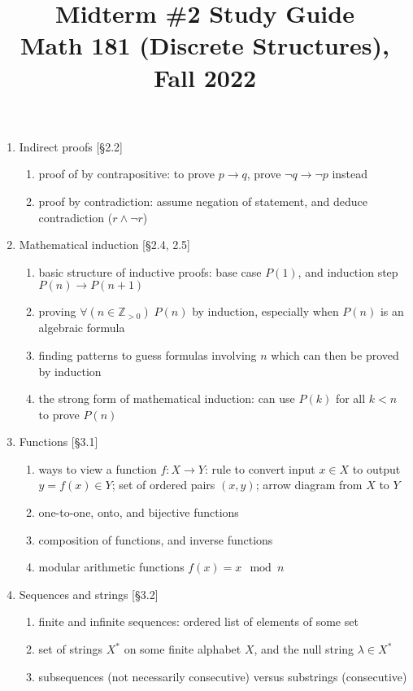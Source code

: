 \documentclass[11pt]{article}
\title{Midterm \#2 Study Guide \\Math 181 (Discrete Structures), Fall 2022}
\date{}
\begin{document}
\maketitle

\thispagestyle{empty}

\vspace{-1cm}

\begin{enumerate}
\item Indirect proofs [\S2.2] 
\begin{enumerate}
\item proof of by contrapositive: to prove $p \to q$, prove $\neg q \to \neg p$ instead
\item proof by contradiction: assume negation of statement, and deduce contradiction ($r \wedge \neg r$)
\end{enumerate}

\item Mathematical induction [\S2.4, 2.5]
\begin{enumerate}
\item basic structure of inductive proofs: base case $P(1)$, and induction step $P(n) \to P(n+1)$
\item proving $\forall (n \in \mathbb{Z}_{>0}) \; P(n)$ by induction, especially when $P(n)$ is an algebraic formula
\item finding patterns to guess formulas involving $n$ which can then be proved by induction
\item the strong form of mathematical induction: can use $P(k)$ for all $k < n$ to prove $P(n)$
\end{enumerate}

\item Functions [\S3.1]
\begin{enumerate}
\item ways to view a function $f\colon X \to Y$: rule to convert input $x\in X$ to output $y=f(x)\in Y$; set of ordered pairs $(x,y)$; arrow diagram from $X$ to $Y$
\item one-to-one, onto, and bijective functions
\item composition of functions, and inverse functions
\item modular arithmetic functions $f(x) = x \mod n$
\end{enumerate}

\item Sequences and strings [\S3.2]
\begin{enumerate}
\item finite and infinite sequences: ordered list of elements of some set
\item set of strings $X^*$ on some finite alphabet $X$, and the null string $\lambda \in X^*$
\item subsequences (not necessarily consecutive) versus substrings (consecutive)
\end{enumerate}


\end{enumerate}
\end{document}
